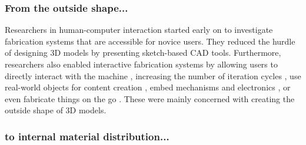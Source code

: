 



\subsubsection{From the outside shape...}

Researchers in human-computer interaction started early on to investigate fabrication systems that are accessible for novice users. They reduced the hurdle of designing 3D models by presenting sketch-based CAD tools. Furthermore, researchers also enabled interactive fabrication systems by allowing users to directly interact with the machine \cite{Willis2011a, Mueller2012a, Peng2016}, increasing the number of iteration cycles \cite{Mueller2014, Mueller2014a}, use real-world objects for content creation \cite{Weichel2014, Weichel2015}, embed mechanisms \cite{Zhang2017} and electronics \cite{Weichel2013, Ledo2017}, or even fabricate things on the go \cite{Roumen2016}. These were mainly concerned with creating the outside shape of 3D models.


\subsubsection{to internal material distribution...}

